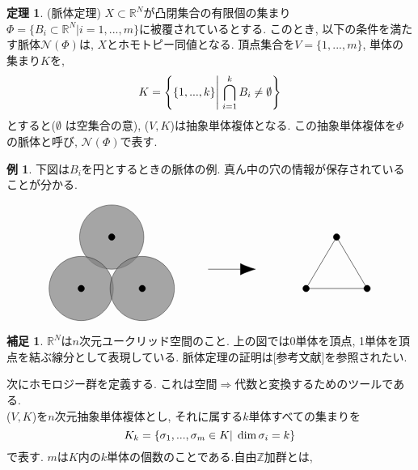 \documentclass[a4paper]{jsarticle}
\theoremstyle{definition}
\newtheorem{thm}[dfn]{定理}
\newtheorem{exam}[dfn]{例}
\newtheorem{hsk}[dfn]{補足}
\begin{document}
\begin{thm}
    (脈体定理) $X\subset \mathbb{R}^N$が凸閉集合の有限個の集まり$\Phi=\{B_i\subset \mathbb{R}^N| i=1,...,m\}$に被覆されているとする. このとき, 以下の条件を満たす脈体$\mathcal{N}(\Phi)$は, $X$とホモトピー同値となる. 頂点集合を$V=\{1,...,m\}$, 単体の集まり$K$を, 
\begin{equation}
   K = \left\{ \{1,...,k\} \middle| \; \bigcap_{i=1}^{k}B_{i} \neq \emptyset \right\} 
 \notag
 \end{equation}
とすると($\emptyset$ は空集合の意), ($V,K$)は抽象単体複体となる. この抽象単体複体を$\Phi$の脈体と呼び, $\mathcal{N}(\Phi)$で表す.
\end{thm}

\begin{exam}下図は$B_i$を円とするときの脈体の例. 真ん中の穴の情報が保存されていることが分かる.
\end{exam}
\begin{equation}
\begin{tikzpicture}
\filldraw[fill=gray, draw=black, opacity=0.7] (-4,0) circle (1);
\filldraw[fill=gray, draw=black, opacity=0.7] (-4.95,-1.6) circle (1);
\filldraw[fill=gray, draw=black, opacity=0.7] (-3.05,-1.6) circle (1);
\filldraw[fill=black, draw=black] (-4,0) circle (0.1);
\filldraw[fill=black, draw=black] (-4.95,-1.6) circle (0.1);
\filldraw[fill=black, draw=black] (-3.05,-1.6) circle (0.1);
\draw [-{Latex[length=5mm]}]  (-1,-1) -- (0.5,-1);
\filldraw[fill=black, draw=black] (3,0) circle (0.1);
\filldraw[fill=black, draw=black] (3.95,-1.6) circle (0.1);
\filldraw[fill=black, draw=black] (2.05,-1.6) circle (0.1);
\draw (3.95, -1.6) -- (2.05, -1.6);
\draw (3.95, -1.6) -- (3, 0);
\draw (3, 0) -- (2.05, -1.6);
\end{tikzpicture}
\notag    
\end{equation}

\begin{hsk}
$\mathbb{R}^N$は$n$次元ユークリッド空間のこと. 上の図では0単体を頂点, 1単体を頂点を結ぶ線分として表現している. 脈体定理の証明は[参考文献]を参照されたい. \\    
\end{hsk}

次にホモロジー群を定義する. これは空間$\Rightarrow$代数と変換するためのツールである. \\
($V,K$)を$n$次元抽象単体複体とし, それに属する$k$単体すべての集まりを
\begin{equation}
    K_k=\{\sigma_1,...,\sigma_m\in K | \; \dim\sigma_i=k \}\notag
\end{equation}
で表す. $m$は$K$内の$k$単体の個数のことである.自由$\mathbb{Z}$加群とは, 
\end{document}
